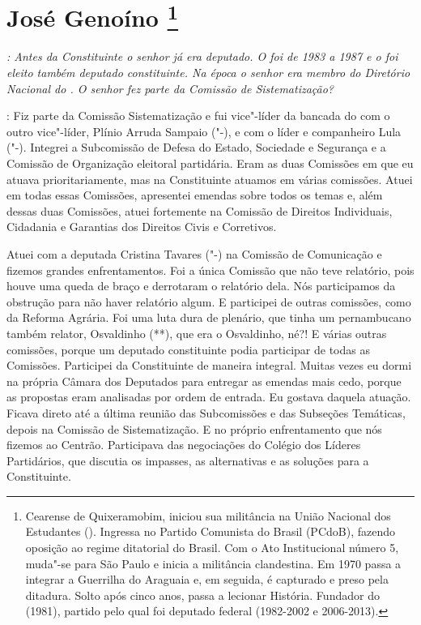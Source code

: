 \chapter{José Genoíno
\footnote{Cearense de Quixeramobim, iniciou sua militância na União Nacional dos
Estudantes (). Ingressa no Partido Comunista do Brasil (PCdoB),
fazendo oposição ao regime ditatorial do Brasil. Com o Ato Institucional
número 5, muda"-se para São Paulo e inicia a militância clandestina. Em
1970 passa a integrar a Guerrilha do Araguaia e, em seguida, é capturado
e preso pela ditadura. Solto após cinco anos, passa a lecionar História.
Fundador do  (1981), partido pelo qual foi deputado federal (1982-2002
e 2006-2013).}}

\emph{: Antes da Constituinte o senhor já era deputado. O foi de 1983 a
1987 e o foi eleito também deputado constituinte. Na época o senhor era
membro do Diretório Nacional do . O senhor fez parte da Comissão de
Sistematização?}

: Fiz parte da Comissão Sistematização e fui vice"-líder
da bancada do  com o outro vice"-líder, Plínio
Arruda Sampaio ("-),
e com o líder e companheiro Lula ("-). Integrei a Subcomissão de
Defesa do Estado, Sociedade e Segurança e a Comissão de Organização
eleitoral partidária. Eram as duas Comissões em que eu atuava
prioritariamente, mas na Constituinte atuamos em várias comissões. Atuei
em todas essas Comissões, apresentei emendas sobre todos os temas e,
além dessas duas Comissões, atuei fortemente na Comissão de Direitos
Individuais, Cidadania e Garantias dos Direitos Civis e Corretivos.

Atuei com a deputada Cristina Tavares ("-) na Comissão de
Comunicação e fizemos grandes enfrentamentos. Foi a única Comissão que
não teve relatório, pois houve uma queda de braço e derrotaram o
relatório dela. Nós participamos da obstrução para não haver relatório
algum. E participei de outras comissões, como da Reforma Agrária. Foi
uma luta dura de plenário, que tinha um pernambucano também relator,
Osvaldinho (**), que era o Osvaldinho, né?! E várias outras comissões,
porque um deputado constituinte podia participar de todas as Comissões.
Participei da Constituinte de maneira integral. Muitas vezes eu dormi na
própria Câmara dos Deputados para entregar as emendas mais cedo, porque
as propostas eram analisadas por ordem de entrada. Eu gostava daquela
atuação. Ficava direto até a última reunião das Subcomissões e das
Subseções Temáticas, depois na Comissão de Sistematização. E no próprio
enfrentamento que nós fizemos ao Centrão. Participava das negociações do
Colégio dos Líderes Partidários, que discutia os impasses, as
alternativas e as soluções para a Constituinte.

